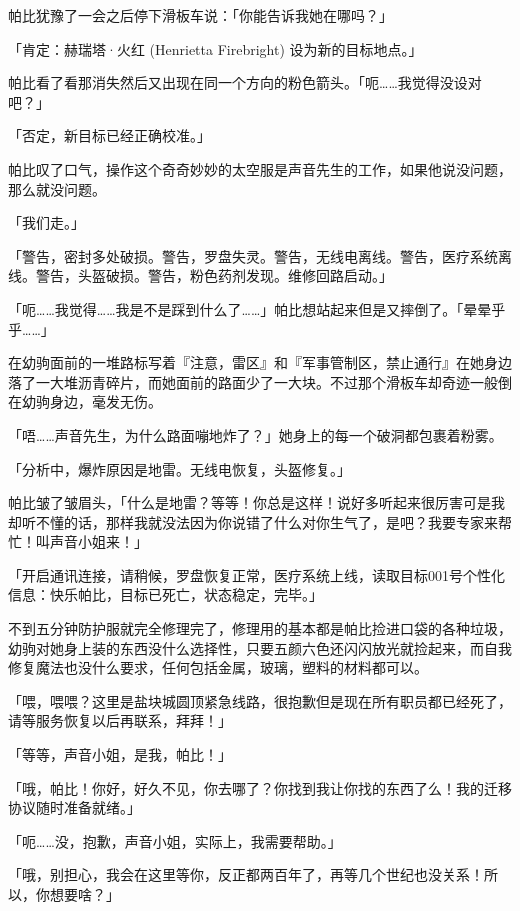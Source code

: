 帕比犹豫了一会之后停下滑板车说：「你能告诉我她在哪吗？」

「{\mt 肯定：赫瑞塔·火红 (Henrietta Firebright) 设为新的目标地点。}」

帕比看了看那消失然后又出现在同一个方向的粉色箭头。「呃……我觉得没设对吧？」

「{\mt 否定，新目标已经正确校准。}」

帕比叹了口气，操作这个奇奇妙妙的太空服是声音先生的工作，如果他说没问题，那么就没问题。

「我们走。」

\horizonline


「{\mt 警告，密封多处破损。警告，罗盘失灵。警告，无线电离线。警告，医疗系统离线。警告，头盔破损。警告，粉色药剂发现。维修回路启动。}」

「呃……我觉得……我是不是踩到什么了……」帕比想站起来但是又摔倒了。「晕晕乎乎……」

在幼驹面前的一堆路标写着『注意，雷区』和『军事管制区，禁止通行』在她身边落了一大堆沥青碎片，而她面前的路面少了一大块。不过那个滑板车却奇迹一般倒在幼驹身边，毫发无伤。

「唔……声音先生，为什么路面嘣地炸了？」她身上的每一个破洞都包裹着粉雾。

「{\mt 分析中，爆炸原因是地雷。无线电恢复，头盔修复。}」

帕比皱了皱眉头，「什么是地雷？等等！你总是这样！说好多听起来很厉害可是我却听不懂的话，那样我就没法因为你说错了什么对你生气了，是吧？我要专家来帮忙！叫声音小姐来！」

「{\mt 开启通讯连接，请稍候，罗盘恢复正常，医疗系统上线，读取目标001号个性化信息：快乐帕比，目标已死亡，状态稳定，完毕。}」

不到五分钟防护服就完全修理完了，修理用的基本都是帕比捡进口袋的各种垃圾，幼驹对她身上装的东西没什么选择性，只要五颜六色还闪闪放光就捡起来，而自我修复魔法也没什么要求，任何包括金属，玻璃，塑料的材料都可以。

「喂，喂喂？这里是盐块城圆顶紧急线路，很抱歉但是现在所有职员都已经死了，请等服务恢复以后再联系，拜拜！」

「等等，声音小姐，是我，帕比！」

「哦，帕比！你好，好久不见，你去哪了？你找到我让你找的东西了么！我的迁移协议随时准备就绪。」

「呃……没，抱歉，声音小姐，实际上，我需要帮助。」

「哦，别担心，我会在这里等你，反正都两百年了，再等几个世纪也没关系！所以，你想要啥？」

